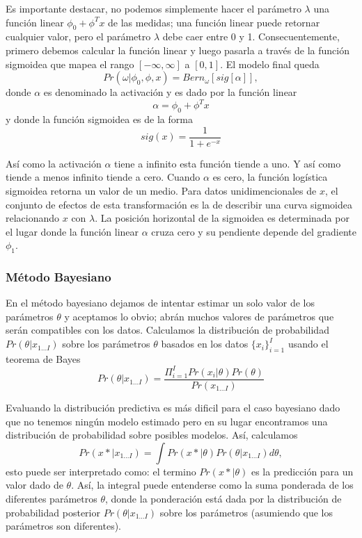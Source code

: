 \documentclass[letter,12pt]{report}
\begin{document}
Es importante destacar, no podemos simplemente hacer el parámetro $\lambda$ una función
linear $\phi_0+\phi^Tx$ de las medidas; una función linear puede retornar cualquier
valor, pero el parámetro $\lambda$ debe caer entre 0 y 1. Consecuentemente, primero
debemos calcular la función linear y luego pasarla a través de la función sigmoidea que
mapea el rango $[-\infty,\infty]$ a $[0, 1]$. El modelo final queda
$$Pr(\omega|\phi_0, \phi, x)=Bern_\omega [sig[\alpha]],$$
donde $\alpha$ es denominado la activación y es dado por la función linear
$$\alpha=\phi_0+\phi^Tx$$
y donde la función sigmoidea\cite{Sigmoid} es de la forma 
$$sig(x)=\frac{1}{1 + e^{-x}}$$

Así como la activación $\alpha$ tiene a infinito esta función tiende a uno. Y así como
tiende a menos infinito tiende a cero. Cuando $\alpha$ es cero, la función logística
sigmoidea retorna un valor de un medio. Para datos unidimencionales de $x$, el conjunto
de efectos de esta transformación es la de describir una curva sigmoidea relacionando $x$
con $\lambda$. La posición horizontal de la sigmoidea es determinada por el lugar donde
la función linear $\alpha$ cruza cero y su pendiente depende del gradiente $\phi_1$.

\subsubsection{Método Bayesiano}
En el método bayesiano\cite{Bayes, Bayes2} dejamos de intentar estimar un solo valor de los parámetros
$\theta$ y aceptamos lo obvio; abrán muchos valores de parámetros que serán
compatibles con los datos. Calculamos la distribución de probabilidad
$Pr(\theta|x_{1...I})$ sobre los parámetros $\theta$ basados en los datos
$\{x_i\}_{i=1}^I$ usando el teorema de Bayes
$$Pr(\theta|x_{1...I})=\frac{\Pi_{i=1}^I
Pr(x_i|\theta)Pr(\theta)}{Pr(x_{1...I})}$$

Evaluando la distribución predictiva es más dificil para el caso bayesiano dado que no
tenemos ningún modelo estimado pero en su lugar encontramos una distribución de
probabilidad sobre posibles modelos. Así, calculamos
$$Pr(x*|x_{1...I})=\int Pr(x*|\theta) Pr(\theta|x_{1...I})d\theta,$$
esto puede ser interpretado como: el termino $Pr(x*|\theta)$ es la predicción para un
valor dado de $\theta$. Así, la integral puede entenderse como la suma ponderada de los
diferentes parámetros $\theta$, donde la ponderación está dada por la distribución de
probabilidad posterior $Pr(\theta|x_{1...I})$ sobre los parámetros (asumiendo que
los parámetros son diferentes).
\end{document}
